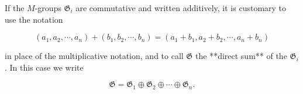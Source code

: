 If the $M$-groups $\mathfrak{G}_i$ are commutative and written additively, it is customary to use the notation

$$(a_1, a_2, \cdots, a_n) + (b_1, b_2, \cdots, b_n) = (a_1 + b_1, a_2 + b_2, \cdots, a_n + b_n)$$

in place of the multiplicative notation, and to call $\mathfrak{G}$ the **direct sum** of the $\mathfrak{G}_i$. In this case we write

$$\mathfrak{G} = \mathfrak{G}_1 \oplus \mathfrak{G}_2 \oplus \cdots \oplus \mathfrak{G}_n.$$
